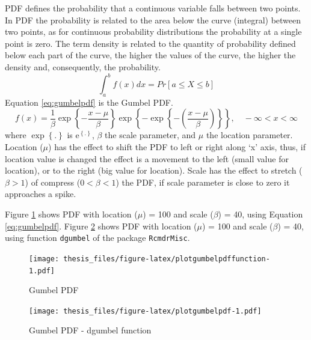 \documentclass[12pt,oneside]{reedthesis}
\begin{document}
PDF defines the probability that a continuous variable falls between two points. In PDF the probability is related to the area below the curve (integral) between two points, as for continuous probability distributions the probability at a single point is zero. The term density is related to the quantity of probability defined below each part of the curve, the higher the values of the curve, the higher the density and, consequently, the probability.
\begin{equation}
        \int_a^b f(x)dx = Pr[a \leq X \leq b]
  \label{eq:pdf}
\end{equation}
Equation \eqref{eq:gumbelpdf} is the Gumbel PDF.
\begin{equation}
          f(x)=\frac{1}{\beta}
          \exp\left\{
            -\frac{x-\mu}{\beta}
          \right\}
          \exp\left\{
            -\exp\left\{
              -\left(
                \frac{x-\mu}{\beta}
              \right)
            \right\}
          \right\},
          \quad -\infty < x < \infty
  \label{eq:gumbelpdf}
\end{equation}
where \(\exp\left\{.\right\}\) is \(\mathrm{e}^{\left\{.\right\}}\), \(\beta\) the scale parameter, and \(\mu\) the location parameter. Location (\(\mu\)) has the effect to shift the PDF to left or right along `x' axis, thus, if location value is changed the effect is a movement to the left (small value for location), or to the right (big value for location). Scale has the effect to stretch (\(\beta > 1\)) of compress (\(0 < \beta< 1\)) the PDF, if scale parameter is close to zero it approaches a spike.

Figure \ref{fig:plotgumbelpdffunction} shows PDF with location (\(\mu\)) = 100 and scale (\(\beta\)) = 40, using Equation \eqref{eq:gumbelpdf}. Figure \ref{fig:plotgumbelpdf} shows PDF with location (\(\mu\)) = 100 and scale (\(\beta\)) = 40, using function \texttt{dgumbel} of the package \texttt{RcmdrMisc}.

\footnotesize
\begin{figure}
\centering
\texttt{[image: thesis\_files/figure-latex/plotgumbelpdffunction-1.pdf]}
\caption{\label{fig:plotgumbelpdffunction}Gumbel PDF}
\end{figure}
\normalsize

\footnotesize
\begin{figure}
\centering
\texttt{[image: thesis\_files/figure-latex/plotgumbelpdf-1.pdf]}
\caption{\label{fig:plotgumbelpdf}Gumbel PDF - dgumbel function}
\end{figure}
\normalsize
\end{document}
